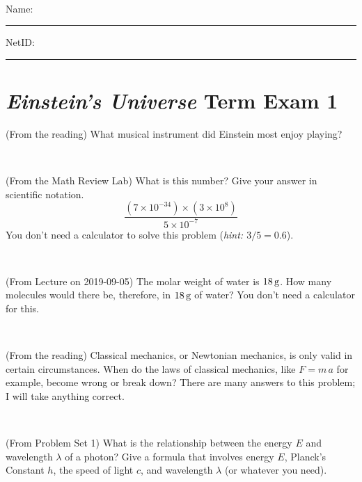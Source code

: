 \documentclass[12pt, letterpaper]{article}
\begin{document}
\vfill ~


\cleardoublepage



\noindent
Name: \rule[-1ex]{0.60\textwidth}{0.1pt}
NetID: \rule[-1ex]{0.20\textwidth}{0.1pt}

\section*{\textsl{Einstein's Universe} Term Exam 1}
\setcounter{problem}{1}


\begin{problem} (From the reading)
What musical instrument did Einstein most enjoy playing?
\end{problem}


\vfill ~

\begin{problem} (From the Math Review Lab)
What is this number? Give your answer in scientific notation.
$$
\frac{(7\times10^{-34})\times(3\times10^8)}{5\times10^{-7}}
$$
You don't need a calculator to solve this problem (\textit{hint: $3/5=0.6$}).
\end{problem}


\vfill ~

\begin{problem} (From Lecture on 2019-09-05)
The molar weight of water is $18\,\mathrm{g}$. How many molecules would there
be, therefore, in $18\,\mathrm{g}$ of water? You don't need a calculator for
this.
\end{problem}


\vfill ~

\begin{problem} (From the reading)
Classical mechanics, or Newtonian mechanics, is only valid in certain
circumstances. When do the laws of classical mechanics, like $F =
m\,a$ for example, become wrong or break down? There are many answers
to this problem; I will take anything correct.
\end{problem}


\vfill ~


\clearpage


\begin{problem} (From Problem Set 1)
What is the relationship between the energy $E$ and wavelength
$\lambda$ of a photon? Give a formula that involves energy $E$,
Planck's Constant $h$, the speed of light $c$, and wavelength
$\lambda$ (or whatever you need).
\end{problem}

\vfill ~
\end{document}
